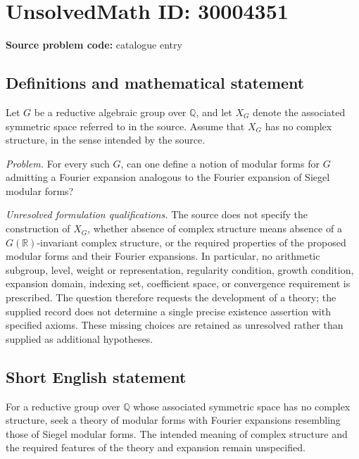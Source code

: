 \documentclass[11pt]{article}
\newcommand{\Q}{\mathbb{Q}}
\newcommand{\R}{\mathbb{R}}
\begin{document}
\section*{UnsolvedMath ID: 30004351}
\textbf{Source problem code:} catalogue entry
\subsection{Definitions and mathematical statement}
Let \(G\) be a reductive algebraic group over \(\Q\), and let \(X_G\) denote the associated symmetric space referred to in the source. Assume that \(X_G\) has no complex structure, in the sense intended by the source.

\emph{Problem.} For every such \(G\), can one define a notion of modular forms for \(G\) admitting a Fourier expansion analogous to the Fourier expansion of Siegel modular forms?

\emph{Unresolved formulation qualifications.} The source does not specify the construction of \(X_G\), whether absence of complex structure means absence of a \(G(\R)\)-invariant complex structure, or the required properties of the proposed modular forms and their Fourier expansions. In particular, no arithmetic subgroup, level, weight or representation, regularity condition, growth condition, expansion domain, indexing set, coefficient space, or convergence requirement is prescribed. The question therefore requests the development of a theory; the supplied record does not determine a single precise existence assertion with specified axioms. These missing choices are retained as unresolved rather than supplied as additional hypotheses.
\subsection{Short English statement}
For a reductive group over \(\Q\) whose associated symmetric space has no complex structure, seek a theory of modular forms with Fourier expansions resembling those of Siegel modular forms. The intended meaning of complex structure and the required features of the theory and expansion remain unspecified.
\end{document}
